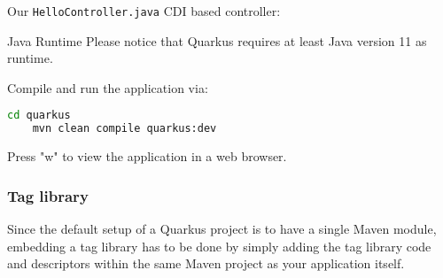 Our \texttt{HelloController.java} CDI based controller:


\begin{TIP}{Java Runtime}
	Please notice that Quarkus requires at least Java version 11 as runtime.
\end{TIP}

Compile and run the application via:
\begin{lstlisting}[language=bash]
	cd quarkus
	mvn clean compile quarkus:dev
\end{lstlisting}
Press "w" to view the application in a web browser.

\subsubsection{Tag library}
Since the default setup of a Quarkus project is to have a single Maven module,
embedding a tag library has to be done by simply adding the tag library code and descriptors within the same Maven project as your application itself.


